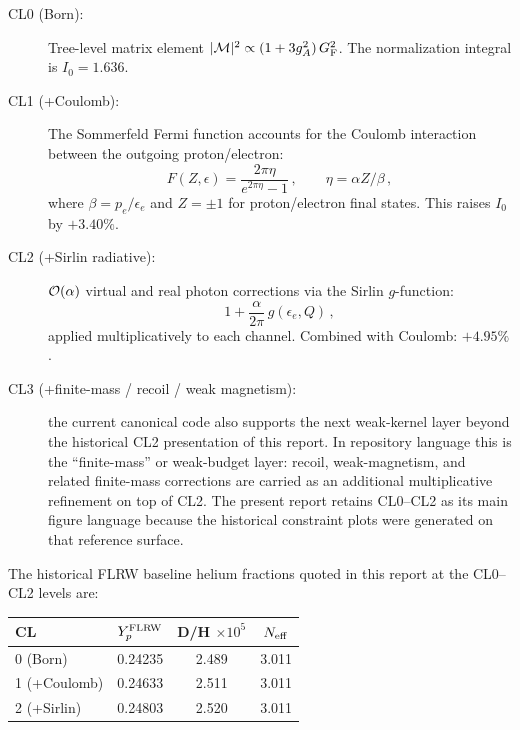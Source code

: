 \begin{description}
\item[CL0 (Born):] Tree-level matrix element $|\mathcal{M}|^2 \propto (1 + 3g_A^2)\,G_{\rm F}^2$.  The normalization integral is $I_0 = 1.636$.

\item[CL1 (+Coulomb):] The Sommerfeld Fermi function accounts for the Coulomb interaction between the outgoing proton/electron:
\begin{equation}
F(Z, \epsilon) = \frac{2\pi\eta}{e^{2\pi\eta} - 1}\,,\qquad \eta = \alpha Z/\beta\,,
\end{equation}
where $\beta = p_e/\epsilon_e$ and $Z = \pm 1$ for proton/electron final states.  This raises $I_0$ by $+3.40\%$.

\item[CL2 (+Sirlin radiative):] $\mathcal{O}(\alpha)$ virtual and real photon corrections via the Sirlin $g$-function:
\begin{equation}
1 + \frac{\alpha}{2\pi}\,g(\epsilon_e, Q)\,,
\end{equation}
applied multiplicatively to each channel.  Combined with Coulomb: $+4.95\%$.

\item[CL3 (+finite-mass / recoil / weak magnetism):] the current canonical code also supports the next weak-kernel layer beyond the historical CL2 presentation of this report.  In repository language this is the ``finite-mass'' or weak-budget layer: recoil, weak-magnetism, and related finite-mass corrections are carried as an additional multiplicative refinement on top of CL2.  The present report retains CL0--CL2 as its main figure language because the historical constraint plots were generated on that reference surface.
\end{description}

The historical FLRW baseline helium fractions quoted in this report at the CL0--CL2 levels are:
\begin{center}
\begin{tabular}{lccc}
\toprule
CL & $Y_p^{\rm FLRW}$ & D/H $\times 10^5$ & $N_{\rm eff}$ \\
\midrule
0 (Born) & 0.24235 & 2.489 & 3.011 \\
1 (+Coulomb) & 0.24633 & 2.511 & 3.011 \\
2 (+Sirlin) & 0.24803 & 2.520 & 3.011 \\
\bottomrule
\end{tabular}
\end{center}

